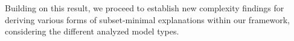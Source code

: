 \documentclass{article}
\newtheorem{theorem}{Theorem}
\newcommand{\x}{\textbf{x}}
\newcommand{\mySuff}{\text{suff}\xspace}
\DeclareMathOperator*{\argmax}{argmax} %
\begin{document}
Building on this result, we proceed to establish new complexity findings for deriving various forms of subset-minimal explanations within our framework, considering the different analyzed model types.


















        
\end{document}
